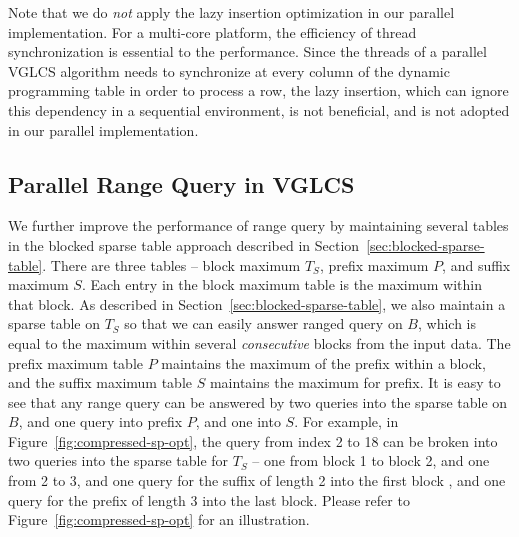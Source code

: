 Note that we do {\em not} apply the lazy insertion optimization in our
parallel implementation.  For a multi-core platform, the efficiency of
thread synchronization is essential to the performance.  Since the
threads of a parallel VGLCS algorithm needs to synchronize at every
column of the dynamic programming table in order to process a row, the
lazy insertion, which can ignore this dependency in a sequential
environment, is not beneficial, and is not adopted in our parallel
implementation.

\subsection{Parallel Range Query in VGLCS}





We further improve the performance of range query by maintaining
several tables in the blocked sparse table approach described in
Section~\ref{sec:blocked-sparse-table}.  There are three tables --
block maximum $T_S$, prefix maximum $P$, and suffix maximum $S$.  Each
entry in the block maximum table is the maximum within that block.  As
described in Section~\ref{sec:blocked-sparse-table}, we also maintain
a sparse table on $T_S$ so that we can easily answer ranged query on
$B$, which is equal to the maximum within several {\em consecutive}
blocks from the input data.  The prefix maximum table $P$ maintains
the maximum of the prefix within a block, and the suffix maximum table
$S$ maintains the maximum for prefix.  It is easy to see that any
range query can be answered by two queries into the sparse table on
$B$, and one query into prefix $P$, and one into $S$.  For example, in
Figure~\ref{fig:compressed-sp-opt}, the query from index 2 to 18 can
be broken into two queries into the sparse table for $T_S$ -- one from
block 1 to block 2, and one from 2 to 3, and one query for the suffix
of length 2 into the first block , and one query for the prefix of
length 3 into the last block.  Please refer to
Figure~\ref{fig:compressed-sp-opt} for an illustration.

